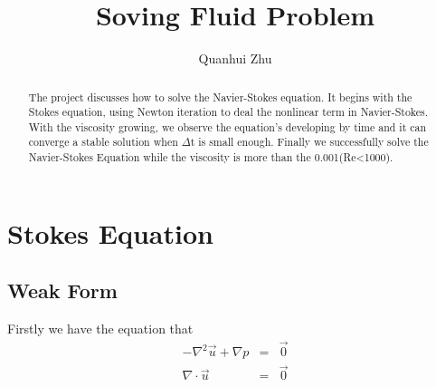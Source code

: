\documentclass[a4paper]{article}
\title{Soving Fluid Problem}
\author{Quanhui Zhu}
\begin{document}
\maketitle

\begin{abstract}
The project discusses how to solve the Navier-Stokes equation. It begins with the Stokes equation, using Newton iteration to deal the nonlinear term in Navier-Stokes. With the viscosity growing, we observe the equation's developing by time and it can converge a stable solution when $\Delta$t is small enough. Finally we successfully solve the Navier-Stokes Equation while the viscosity is more than the 0.001(Re<1000).
\end{abstract}


\section{Stokes Equation}

\subsection{Weak Form}

Firstly we have the equation that
\begin{equation}
\begin{array}{rcl}
-\nabla^2 \vec{u} + \nabla p &=& \vec{0} \\
\nabla \cdot \vec{u} &=& \vec{0}
\label{eq::Stokes-problem}
\end{array}
\end{equation}
\end{document}
